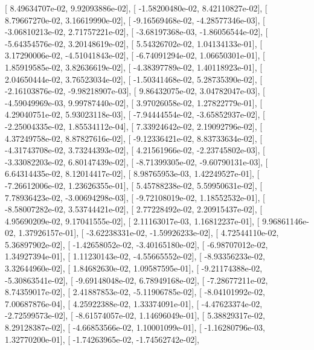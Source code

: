 \documentclass{article}
\begin{document}
       [  8.49634707e-02,   9.92093886e-02],
       [ -1.58200480e-02,   8.42110827e-02],
       [  8.79667270e-02,   3.16619990e-02],
       [ -9.16569468e-02,  -4.28577346e-03],
       [ -3.06810213e-02,   2.71757221e-02],
       [ -3.68197368e-03,  -1.86056544e-02],
       [ -5.64354576e-02,   3.20148619e-02],
       [  5.54326702e-02,   1.04134133e-01],
       [  3.17290006e-02,  -4.51041843e-02],
       [ -6.74091294e-02,   1.06650301e-01],
       [  1.85919585e-02,   3.82636619e-02],
       [ -4.38397789e-02,   1.40118923e-01],
       [  2.04650444e-02,   3.76523034e-02],
       [ -1.50341468e-02,   5.28735390e-02],
       [ -2.16103876e-02,  -9.98218907e-03],
       [  9.86432075e-02,   3.04782047e-03],
       [ -4.59049969e-03,   9.99787440e-02],
       [  3.97026058e-02,   1.27822779e-01],
       [  4.29040751e-02,   5.93023118e-03],
       [ -7.94444554e-02,  -3.65852937e-02],
       [ -2.25004335e-02,   1.85534112e-04],
       [  7.33924642e-02,   2.19092796e-02],
       [  4.37249758e-02,   8.87827616e-02],
       [ -9.12336421e-02,   8.83733634e-02],
       [ -4.31743708e-02,   3.73244393e-02],
       [  4.21561966e-02,  -2.23745802e-03],
       [ -3.33082203e-02,   6.80147439e-02],
       [ -8.71399305e-02,  -9.60790131e-03],
       [  6.64314435e-02,   8.12014417e-02],
       [  8.98765953e-03,   1.42249527e-01],
       [ -7.26612006e-02,   1.23626355e-01],
       [  5.45788238e-02,   5.59950631e-02],
       [  7.78936423e-02,  -3.00694298e-03],
       [ -9.72108019e-02,   1.18552532e-01],
       [ -8.58007282e-02,   3.53744421e-02],
       [  2.77228492e-02,   2.20915437e-02],
       [  4.95690209e-02,   9.17041555e-02],
       [  2.11163017e-03,   1.16812237e-01],
       [  9.96861146e-02,   1.37926157e-01],
       [ -3.62238331e-02,  -1.59926233e-02],
       [  4.72544110e-02,   5.36897902e-02],
       [ -1.42658052e-02,  -3.40165180e-02],
       [ -6.98707012e-02,   1.34927394e-01],
       [  1.11230143e-02,  -4.55665552e-02],
       [ -8.93356233e-02,   3.32644960e-02],
       [  1.84682630e-02,   1.09587595e-01],
       [ -9.21174388e-02,  -5.30863541e-02],
       [ -9.69148048e-02,   6.78949168e-02],
       [ -7.28677211e-02,   8.74359017e-02],
       [  2.41887853e-02,  -5.11906785e-02],
       [ -8.04101992e-02,   7.00687876e-04],
       [  4.25922388e-02,   1.33374091e-01],
       [ -4.47623374e-02,  -2.72599573e-02],
       [ -8.61574057e-02,   1.14696049e-01],
       [  5.38829317e-02,   8.29128387e-02],
       [ -4.66853566e-02,   1.10001099e-01],
       [ -1.16280796e-03,   1.32770200e-01],
       [ -1.74263965e-02,  -1.74562742e-02],
\end{document}
